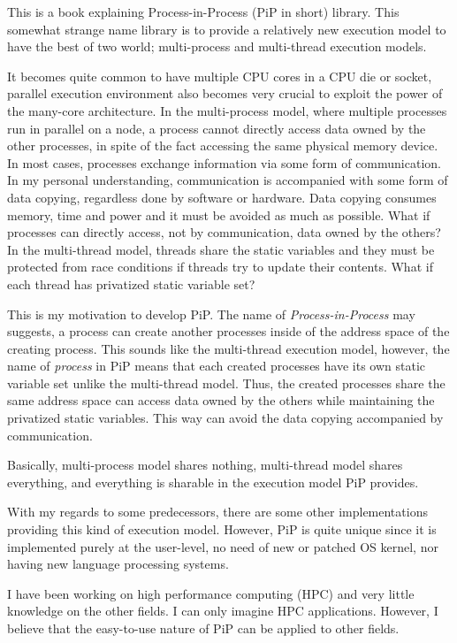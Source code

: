 
This is a book explaining Process-in-Process (PiP in short)
library. This somewhat strange name library is to provide a relatively
new execution model to have the best of two world; multi-process and
multi-thread execution models. 

It becomes quite common to have multiple CPU cores in a CPU
die or socket, parallel execution environment also becomes very
crucial to exploit the power of the many-core architecture.
In the multi-process model, where multiple 
processes run in parallel on a node, a process cannot directly access
data owned 
by the other processes, in spite of the fact accessing the same physical
memory device. In most cases, processes exchange information via some
form of communication. In my personal understanding, communication is
accompanied with some form of data copying, regardless done by software or
hardware. Data copying consumes memory, time and power and it must be
avoided as much as possible. What if processes can directly access, not by
communication, data owned by the others? In the multi-thread model,
threads share the static variables and they must be protected from
race conditions if threads try to update their contents. What if each
thread has privatized static variable set? 

This is my motivation to develop PiP. The name of {\it
  Process-in-Process} may suggests, a process can create another
processes inside of the address space of the creating process. This
sounds like the multi-thread execution model, however, the name of
{\it process} in PiP means that each created processes have its own
static variable set unlike the multi-thread model. Thus, the created
processes share the same address space can access data owned by the
others while maintaining the privatized static variables. This way can
avoid the data copying accompanied by communication.

Basically, multi-process model shares nothing, multi-thread model
shares everything, and everything is sharable in the execution model
PiP provides. 

With my regards to some predecessors, there are some other
implementations providing this kind of execution model. However, PiP
is quite unique since it is implemented purely at the user-level, no
need of new or patched OS kernel, nor having new language processing
systems.  

I have been working on high performance computing (HPC) and very little
knowledge on the other fields. I can only imagine HPC
applications. However, I believe that the easy-to-use nature of PiP
can be applied to other fields. 
